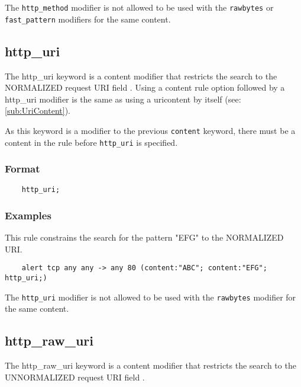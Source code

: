 \documentclass[english]{report}
\newenvironment{note}{
\samepage
    \vspace{10pt}{\textsf{
        {\hspace{7pt}\Huge{$\triangle$\hspace{-12.5pt}{\Large{$^!$}}}}\hspace{5pt}
        {\Large{NOTE}}
    }
    }
   \begin{center}
    \par\vspace{-17pt}

    \begin{lrbox}{\savepar}
    \begin{minipage}[r]{6in}
}
{
    \end{minipage}
    \end{lrbox}
    \fbox{
        \usebox{
            \savepar
	}
    }
    \par\vskip10pt
    \end{center}
}
\newenvironment{note}{
        \begin{rawhtml}
        <p><table border="1"><tr><td><b>
        Note:&nbsp;&nbsp;</b>
        \end{rawhtml}
}{
        \begin{rawhtml}
        </b></td></tr></table></p>
        \end{rawhtml}
}
\begin{document}
\begin{note}

The \texttt{http\_method} modifier is not allowed to be used with the
\texttt{rawbytes} or \texttt{fast\_pattern} modifiers for the same content.

\end{note}

\subsection{http\_uri}
\label{sub:HttpUri}

The http\_uri keyword is a content modifier that restricts the search to the
NORMALIZED request \textsc{URI} field .  Using a content rule option followed
by a http\_uri modifier is the same as using a uricontent by itself (see:
\ref{sub:UriContent}).

As this keyword is a modifier to the previous \texttt{content} keyword, there must be
a content in the rule before \texttt{http\_uri} is specified.

\subsubsection{Format}

\begin{verbatim}
    http_uri;
\end{verbatim}

\subsubsection{Examples}

This rule constrains the search for the pattern "EFG" to the NORMALIZED URI.

\begin{verbatim}
    alert tcp any any -> any 80 (content:"ABC"; content:"EFG"; http_uri;)
\end{verbatim}

\begin{note}

The \texttt{http\_uri} modifier is not allowed to be used with the
\texttt{rawbytes} modifier for the same content.

\end{note}

\subsection{http\_raw\_uri}
\label{sub:RawHttpUri}
The http\_raw\_uri keyword is a content modifier that restricts the search to the
UNNORMALIZED request \textsc{URI} field . 
\end{document}
